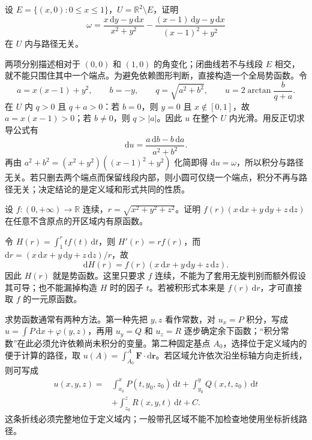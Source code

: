 \begin{example}
\label{ex:path-independent-difference-angular-forms}
设 $E=\{(x,0):0\leq x\leq1\}$，$U=\mathbb R^2\setminus E$，证明
\[
    \omega=\frac{x\,\mathrm dy-y\,\mathrm dx}{x^2+y^2}
     -\frac{(x-1)\,\mathrm dy-y\,\mathrm dx}{(x-1)^2+y^2}
\]
在 $U$ 内与路径无关。
\end{example}
\begin{solve}
两项分别描述相对于 $(0,0)$ 和 $(1,0)$ 的角变化；闭曲线若不与线段 $E$ 相交，就不能只围住其中一个端点。为避免依赖图形判断，直接构造一个全局势函数。令
\[
    a=x(x-1)+y^2,\qquad b=-y,\qquad q=\sqrt{a^2+b^2},
    \qquad u=2\arctan\frac b{q+a}.
\]
在 $U$ 内 $q>0$ 且 $q+a>0$：若 $b=0$，则 $y=0$ 且 $x\notin[0,1]$，故 $a=x(x-1)>0$；若 $b\neq0$，则 $q>|a|$。因此 $u$ 在整个 $U$ 内光滑。用反正切求导公式有
\[
    \mathrm du=\frac{a\,\mathrm db-b\,\mathrm da}{a^2+b^2}.
\]
再由 $a^2+b^2=(x^2+y^2)((x-1)^2+y^2)$ 化简即得 $\mathrm du=\omega$，所以积分与路径无关。若只删去两个端点而保留线段内部，则小圆可仅绕一个端点，积分不再与路径无关；决定结论的是定义域和形式共同的性质。
\end{solve}

\begin{example}
\label{ex:path-independent-radial-field}
设 $f:(0,+\infty)\to\mathbb R$ 连续，$r=\sqrt{x^2+y^2+z^2}$。证明 $f(r)(x\,\mathrm dx+y\,\mathrm dy+z\,\mathrm dz)$ 在任意不含原点的开区域内有原函数。
\end{example}
\begin{solve}
令 $H(r)=\int_1^r t f(t)\,\mathrm dt$，则 $H'(r)=rf(r)$，而 $\mathrm dr=(x\,\mathrm dx+y\,\mathrm dy+z\,\mathrm dz)/r$，故
\[
    \mathrm dH(r)=f(r)(x\,\mathrm dx+y\,\mathrm dy+z\,\mathrm dz).
\]
因此 $H(r)$ 就是势函数。这里只要求 $f$ 连续，不能为了套用无旋判别而额外假设其可导；也不能漏掉构造 $H$ 时的因子 $t$。若被积形式本来是 $f(r)\,\mathrm dr$，才可直接取 $f$ 的一元原函数。
\end{solve}

求势函数通常有两种方法。第一种先把 $y,z$ 看作常数，对 $u_x=P$ 积分，写成 $u=\int P\,\mathrm dx+\varphi(y,z)$，再用 $u_y=Q$ 和 $u_z=R$ 逐步确定余下函数；“积分常数”在此必须允许依赖尚未积分的变量。第二种固定基点 $A_0$，选择位于定义域内的便于计算的路径，取 $u(A)=\int_{A_0}^A\boldsymbol F\cdot\mathrm d\boldsymbol r$。若区域允许依次沿坐标轴方向走折线，则可写成
\begin{align*}
    u(x,y,z)={}&\int_{x_0}^xP(t,y_0,z_0)\,\mathrm dt
    +\int_{y_0}^yQ(x,t,z_0)\,\mathrm dt\\
    &+\int_{z_0}^zR(x,y,t)\,\mathrm dt+C.
\end{align*}
这条折线必须完整地位于定义域内；一般带孔区域不能不加检查地使用坐标折线路径。

